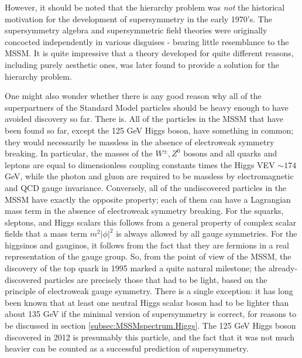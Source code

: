 \documentclass[11pt]{article}
\begin{document}
However, it should be noted that the hierarchy problem was {\it not} the 
historical motivation for the development of supersymmetry in the early 
1970's. The supersymmetry algebra and supersymmetric field theories were 
originally concocted independently in various disguises 
\cite{RNS}-\cite{Volkov} 
bearing little resemblance to the MSSM. It is quite impressive that a 
theory developed for quite different reasons, including purely aesthetic 
ones, was later found to provide a solution for the hierarchy problem.

One might also wonder whether there is any good reason why all of the
superpartners of the Standard Model particles should be heavy enough to
have avoided discovery so far. There is. All of the particles in the MSSM
that have been found so far, except the 125 GeV Higgs boson, 
have something in common; they would
necessarily be massless in the absence of electroweak symmetry breaking.
In particular, the masses of the $W^\pm, Z^0$ bosons and all quarks and
leptons are equal to dimensionless coupling constants times the Higgs VEV
$\sim 174 $ GeV, while the photon and gluon are required to be massless by
electromagnetic and QCD gauge invariance. Conversely, all of the
undiscovered particles in the MSSM have exactly the opposite property;
each of them can have a Lagrangian mass term in the absence of electroweak
symmetry breaking. For the squarks, sleptons, and Higgs scalars this
follows from a general property of complex scalar fields that a mass term
$m^2 |\phi|^2$ is always allowed by all gauge symmetries. For the
higgsinos and gauginos, it follows from the fact that they are fermions in
a real representation of the gauge group. So, from the point of view of
the MSSM, the discovery of the top quark in 1995 marked a quite natural
milestone; the already-discovered particles are precisely those that had
to be light, based on the principle of electroweak gauge symmetry. There
is a single exception: it has long been known that at least
one neutral Higgs scalar boson had to be lighter
than about 135 GeV if the minimal version of supersymmetry is correct, for
reasons to be discussed in section \ref{subsec:MSSMspectrum.Higgs}. 
The 125 GeV Higgs boson discovered in 2012 is presumably this particle, and the fact 
that it was not much heavier can be counted as a successful prediction of supersymmetry. 
\end{document}
